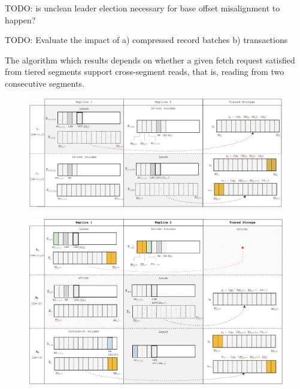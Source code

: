 \documentclass{article}
\begin{document}
TODO: is unclean leader election necessary for base offset misalignment to happen?

TODO: Evaluate the impact of a) compressed record batches b) transactions

The algorithm which results depends on whether a given fetch request satisfied from tiered segments support cross-segment reads, that is, reading from two consecutive segments. 

\begin{figure}[h!]
	\includegraphics[scale=0.4]{left-overlap.png}
	\label{fig:left-overlap}
\end{figure}

\begin{figure}[h!]
	\includegraphics[scale=0.4]{right-overlap.png}
	\label{fig:right-overlap}
\end{figure}
\end{document}
